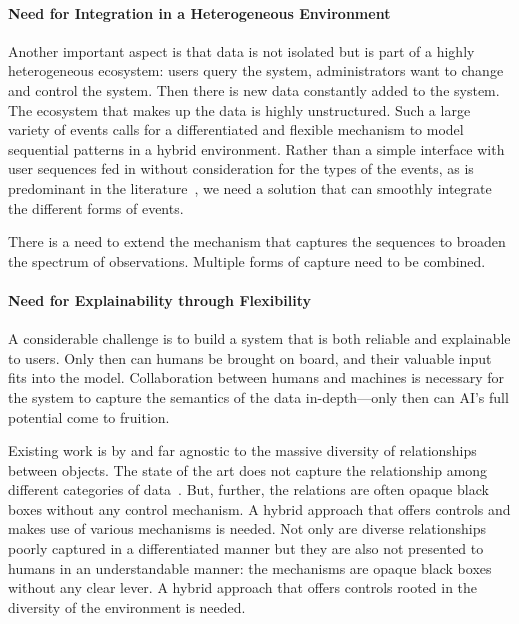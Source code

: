 \paragraph{Need for Integration in a Heterogeneous Environment}
%
Another important aspect is that data is not isolated but is part of a highly heterogeneous ecosystem: users query the system, administrators want to change and control the system. Then there is new data constantly added to the system. The ecosystem that makes up the data is highly unstructured. Such a large variety of events calls for a differentiated and flexible mechanism to model sequential patterns in a hybrid environment. Rather than a simple interface with user sequences fed in without consideration for the types of the events, as is predominant in the literature~\cite{sun2019bert4rec}, we need a solution that can smoothly integrate the different forms of events.

There is a need to extend the mechanism that captures the sequences to broaden the spectrum of observations. Multiple forms of capture need to be combined. 


\paragraph{Need for Explainability through Flexibility}
%
A considerable challenge is to build a system that is both reliable and explainable to users. Only then can humans be brought on board, and their valuable input fits into the model. Collaboration between humans and machines is necessary for the system to capture the semantics of the data in-depth---only then can AI's full potential come to fruition.

Existing work is by and far agnostic to the massive diversity of relationships between objects. The state of the art does not capture the relationship among different categories of data~\cite{sun2019bert4rec}. But, further, the relations are often opaque black boxes without any control mechanism. A hybrid approach that offers controls and makes use of various mechanisms is needed. Not only are diverse relationships poorly captured in a differentiated manner but they are also not presented to humans in an understandable manner: the mechanisms are opaque black boxes without any clear lever. A hybrid approach that offers controls rooted in the diversity of the environment is needed.

